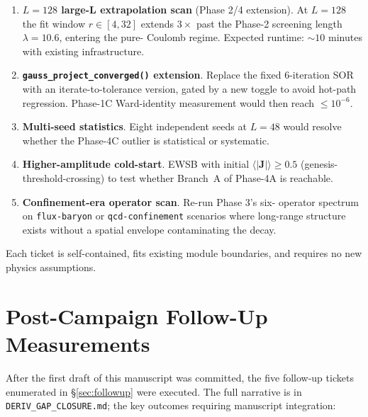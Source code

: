 \documentclass[11pt,letterpaper]{article}
\begin{document}
\begin{enumerate}
  \item \textbf{$L = 128$ large-L extrapolation scan} (Phase 2/4
    extension). At $L = 128$ the fit window $r \in [4, 32]$ extends $3\times$
    past the Phase-2 screening length $\lambda = 10.6$, entering the pure-
    Coulomb regime. Expected runtime: $\sim 10$ minutes with existing
    infrastructure.
  \item \textbf{\texttt{gauss\_project\_converged()} extension}. Replace the
    fixed 6-iteration SOR with an iterate-to-tolerance version, gated by a
    new toggle to avoid hot-path regression. Phase-1C Ward-identity
    measurement would then reach $\leq 10^{-6}$.
  \item \textbf{Multi-seed statistics}. Eight independent seeds at $L = 48$
    would resolve whether the Phase-4C outlier is statistical or systematic.
  \item \textbf{Higher-amplitude cold-start}. EWSB with initial
    $\langle|\mathbf{J}|\rangle \geq 0.5$ (genesis-threshold-crossing) to
    test whether Branch~A of Phase-4A is reachable.
  \item \textbf{Confinement-era operator scan}. Re-run Phase 3's six-
    operator spectrum on \texttt{flux-baryon} or \texttt{qcd-confinement}
    scenarios where long-range structure exists without a spatial
    envelope contaminating the decay.
\end{enumerate}

Each ticket is self-contained, fits existing module boundaries, and
requires no new physics assumptions.

\section{Post-Campaign Follow-Up Measurements}
\label{sec:postcampaign}

After the first draft of this manuscript was committed, the five
follow-up tickets enumerated in \S\ref{sec:followup} were executed.
The full narrative is in \texttt{DERIV\_GAP\_CLOSURE.md}; the key
outcomes requiring manuscript integration:
\end{document}
